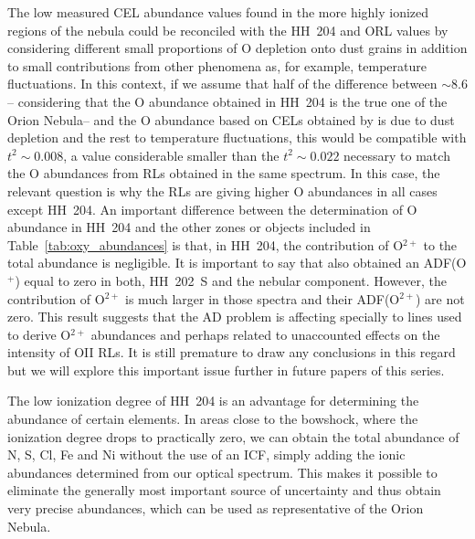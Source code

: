 \documentclass[twocolumn]{aastex63}
\newcommand{\eduardo}[1]{{\color{teal}E: #1}}
\newcommand{\jorge}[1]{{\color{magenta}J: #1}}
\begin{document}
The low measured CEL abundance values found in the more highly ionized regions of the nebula could be reconciled with the HH~204 and ORL values by considering different small proportions of O depletion onto dust grains in addition to small contributions from other phenomena as, for example, temperature fluctuations. In this context, if we assume that half of the difference between $\sim 8.6$ -- considering that the O abundance obtained in HH~204 is the true one of the Orion Nebula-- and the O abundance based on CELs obtained by  \citet[][]{Esteban04} is due to dust depletion and the rest to temperature fluctuations, this would be compatible with $t^2\sim 0.008$, a value considerable smaller than the $t^2\sim 0.022$ necessary to match the O abundances from RLs obtained in the same spectrum. In this case, the relevant question is why the RLs are giving higher O abundances in all cases except HH~204. An important difference between the determination of O abundance in HH~204 and the other zones or objects included in Table~\ref{tab:oxy_abundances} is that, in HH~204, the contribution of O$^{2+}$ to the total abundance is negligible. It is important to say that \citet{mesadelgado09} also obtained an  ADF(O$^{+}$) equal to zero in both, HH~202~S and the nebular component. However, the contribution of O$^{2+}$ is much larger in those spectra and their ADF(O$^{2+}$) are not zero. This result suggests that the AD problem is affecting specially to lines used to derive O$^{2+}$ abundances and perhaps related to unaccounted effects on the intensity of O\thinspace II RLs.  It is still premature to draw any conclusions in this regard but we will explore this important issue further in future papers of this series. %

The low ionization degree of HH~204 is an advantage for determining the abundance of certain elements. In areas close to the bowshock, where the ionization degree drops to practically zero, we can obtain the total abundance of N, S, Cl, Fe and Ni without the use of an ICF, simply adding the ionic abundances determined from our optical spectrum. This makes it possible to eliminate the generally most important source of uncertainty and thus obtain very precise abundances, which can be used as representative of the Orion Nebula. %
\end{document}
